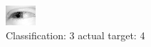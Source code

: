 \begin{figure}[h!]
\begin{center}
\includegraphics[width=0.60\columnwidth]{figures/ID2516_class_3_target_4.png}
\end{center}
\caption{ Classification: 3 actual target: 4}
\label{fig:ID2516_class_3_target_4}
\end{figure}
